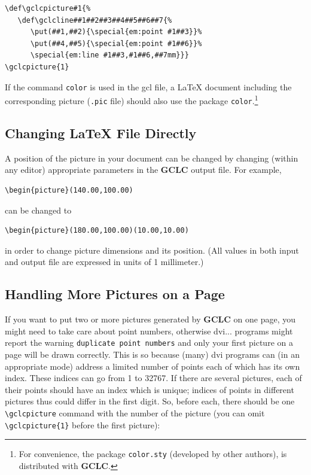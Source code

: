 \documentclass[a4paper]{book}
\newcommand{\gclc}{{\bfseries GCLC}\xspace}
\begin{document}
\begin{verbatim}
\def\gclcpicture#1{%
   \def\gclcline##1##2##3##4##5##6##7{%
      \put(##1,##2){\special{em:point #1##3}}%
      \put(##4,##5){\special{em:point #1##6}}%
      \special{em:line #1##3,#1##6,##7mm}}}
\gclcpicture{1}
\end{verbatim}

If the command \verb|color| is used in the {\sc gcl} file, a \LaTeX{}
document including the corresponding picture (\verb|.pic| file) should
also use the package \verb|color|.\footnote{For convenience, the
package {\tt color.sty} (developed by other authors), is distributed
with \gclc.}


\subsection{Changing \LaTeX{} File Directly}

A position of the picture in your document can be changed by changing
(within any editor) appropriate parameters in the \gclc output file.
For example,

\begin{verbatim}
\begin{picture}(140.00,100.00)
\end{verbatim}

\noindent
can be changed to

\begin{verbatim}
\begin{picture}(180.00,100.00)(10.00,10.00)
\end{verbatim}

\noindent
in order to change picture dimensions and its position. (All values
in both input and output file are expressed in units of 1 millimeter.)


\subsection{Handling More Pictures on a Page}

If you want to put two or more pictures generated by \gclc on one
page, you might need to take care about point numbers, otherwise {\sc dvi}...
programs might report the warning \verb|duplicate point numbers| and
only your first picture on a page will be drawn correctly. This is
so because (many) {\sc dvi} programs can (in an appropriate mode)
address a limited number of points each of which has its own index.
These indices can go from 1 to 32767. If there are several pictures,
each of their points should have an index which is unique; indices
of points in different pictures thus could differ in the first digit.
So, before each, there should be one \verb|\gclcpicture| command with
the number of the picture (you can omit \verb|\gclcpicture{1}|
before the first picture):
\end{document}
